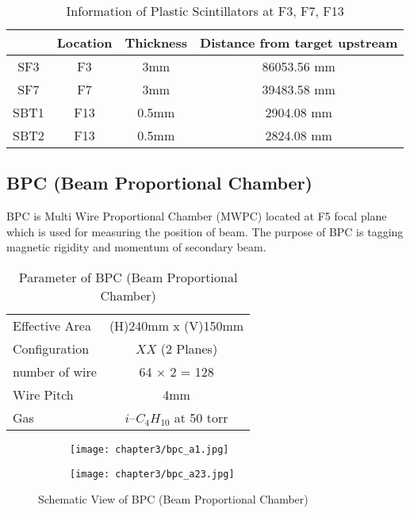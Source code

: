 \begin{table}[h]
    \centering
    \begin{tabular}{c|ccc}
        \hline
        & Location & Thickness & Distance from target upstream \\
        \hline
        SF3 & F3 & 3mm & 86053.56 mm\\
        SF7 & F7 & 3mm & 39483.58 mm\\
        SBT1 & F13 &0.5mm & 2904.08 mm\\
        SBT2 & F13 &0.5mm & 2824.08 mm\\
        \hline
    \end{tabular}
    \caption{Information of Plastic Scintillators at F3, F7, F13}
\end{table}


\subsection{BPC (Beam Proportional Chamber)}
BPC is Multi Wire Proportional Chamber (MWPC) located at F5 focal plane which is used for measuring the position of beam. The purpose of BPC is tagging magnetic rigidity and momentum of secondary beam.
\begin{table}[h]
    \centering
    \begin{tabular}{l|c}
        \hline
        Effective Area & (H)240mm x (V)150mm \\
        Configuration & $XX$ (2 Planes) \\
        number of wire & 64 $\times$ 2 = 128 \\
        Wire Pitch & 4mm \\
        Gas & $i$--${C}_{4} {H}_{10}$ at 50 torr\\
        \hline
    \end{tabular}
    \caption{Parameter of BPC (Beam Proportional Chamber) \cite{SAMURAI}}
\end{table}


\begin{figure}[h]
    \centering
    \begin{subfigure}[h]{\textwidth}
        \centering
        \texttt{[image: chapter3/bpc\_a1.jpg]}
    \end{subfigure}
    \begin{subfigure}[h]{\textwidth}
        \hspace{2.4cm}
        \texttt{[image: chapter3/bpc\_a23.jpg]}
    \end{subfigure}
        \caption{Schematic View of BPC (Beam Proportional Chamber) \cite{SAMURAI}}
\end{figure}

